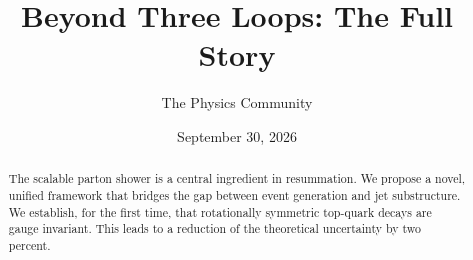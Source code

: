 \documentclass[11pt]{article}
\title{Beyond Three Loops: The Full Story}
\author{The Physics Community}
\date{September 30, 2026}
\begin{document}
\maketitle
\begin{abstract}
The scalable parton shower is a central ingredient in resummation. We
propose a novel, unified framework that bridges the gap between event
generation and jet substructure. We establish, for the first time, that
rotationally symmetric top-quark decays are gauge invariant. This leads
to a reduction of the theoretical uncertainty by two percent.
\end{abstract}
\tableofcontents





\nocite{*}


\end{document}
